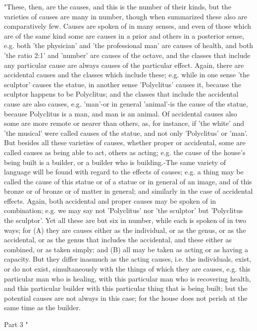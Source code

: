 "These, then, are the causes, and this is the number of their kinds,
but the varieties of causes are many in number, though when summarized
these also are comparatively few. Causes are spoken of in many senses,
and even of those which are of the same kind some are causes in a
prior and others in a posterior sense, e.g. both 'the physician' and
'the professional man' are causes of health, and both 'the ratio 2:1'
and 'number' are causes of the octave, and the classes that include
any particular cause are always causes of the particular effect. Again,
there are accidental causes and the classes which include these; e.g.
while in one sense 'the sculptor' causes the statue, in another sense
'Polyclitus' causes it, because the sculptor happens to be Polyclitus;
and the classes that include the accidental cause are also causes,
e.g. 'man'-or in general 'animal'-is the cause of the statue, because
Polyclitus is a man, and man is an animal. Of accidental causes also
some are more remote or nearer than others, as, for instance, if 'the
white' and 'the musical' were called causes of the statue, and not
only 'Polyclitus' or 'man'. But besides all these varieties of causes,
whether proper or accidental, some are called causes as being able
to act, others as acting; e.g. the cause of the house's being built
is a builder, or a builder who is building.-The same variety of language
will be found with regard to the effects of causes; e.g. a thing may
be called the cause of this statue or of a statue or in general of
an image, and of this bronze or of bronze or of matter in general;
and similarly in the case of accidental effects. Again, both accidental
and proper causes may be spoken of in combination; e.g. we may say
not 'Polyclitus' nor 'the sculptor' but 'Polyclitus the sculptor'.
Yet all these are but six in number, while each is spoken of in two
ways; for (A) they are causes either as the individual, or as the
genus, or as the accidental, or as the genus that includes the accidental,
and these either as combined, or as taken simply; and (B) all may
be taken as acting or as having a capacity. But they differ inasmuch
as the acting causes, i.e. the individuals, exist, or do not exist,
simultaneously with the things of which they are causes, e.g. this
particular man who is healing, with this particular man who is recovering
health, and this particular builder with this particular thing that
is being built; but the potential causes are not always in this case;
for the house does not perish at the same time as the builder.

Part 3 "


